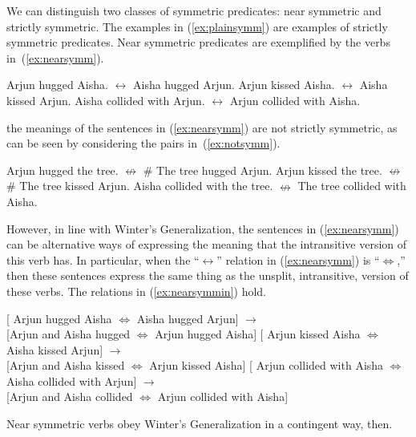\documentclass[twoside, 12pt]{article}
\begin{document}
We can distinguish two classes of symmetric predicates: near symmetric and strictly symmetric. The examples in (\ref{ex:plainsymm}) are examples of strictly symmetric predicates. Near symmetric predicates are exemplified by the verbs in~(\ref{ex:nearsymm}).
\begin{exe}
\raggedright
  \ex \label{ex:nearsymm}
  \begin{xlist}
    \ex Arjun hugged Aisha. $\leftrightarrow$ Aisha hugged Arjun.
    \ex Arjun kissed Aisha. $\leftrightarrow$ Aisha kissed Arjun.
    \ex Aisha collided with Arjun. $\leftrightarrow$ Arjun collided with Aisha.
  \end{xlist}
\end{exe}
the meanings of the sentences in (\ref{ex:nearsymm}) are not strictly symmetric, as can be seen by considering the pairs in~(\ref{ex:notsymm}).
\begin{exe}
\raggedright
  \ex \label{ex:notsymm}
  \begin{xlist}
    \ex Arjun hugged the tree. $\nleftrightarrow$ \# The tree hugged Arjun.
    \ex Arjun kissed the tree. $\nleftrightarrow$ \# The tree kissed Arjun.
    \ex Aisha collided with the tree. $\nleftrightarrow$ The tree collided with Aisha.
  \end{xlist}
\end{exe}
However, in line with Winter's Generalization, the sentences in (\ref{ex:nearsymm}) can be alternative ways of expressing the meaning that the intransitive version of this verb has. In particular, when the ``$\leftrightarrow$'' relation in (\ref{ex:nearsymm}) is ``$\Leftrightarrow$,'' then these sentences express the same thing as the unsplit, intransitive, version of these verbs. The relations in (\ref{ex:nearsymmin}) hold.
\begin{exe}
  \ex \label{ex:nearsymmin}
  \begin{xlist}
    \ex {} [ Arjun hugged Aisha $\Leftrightarrow$ Aisha hugged Arjun] $\rightarrow$\\ {} [Arjun and Aisha hugged $\Leftrightarrow$ Arjun hugged Aisha] 
    \ex {} [ Arjun kissed Aisha $\Leftrightarrow$ Aisha kissed Arjun] $\rightarrow$\\ {} [Arjun and Aisha kissed $\Leftrightarrow$ Arjun kissed Aisha] 
    \ex {} [ Arjun collided with Aisha $\Leftrightarrow$ Aisha collided with Arjun] $\rightarrow$\\ {} [Arjun and Aisha collided $\Leftrightarrow$ Arjun collided with Aisha] 
  \end{xlist}
\end{exe}
Near symmetric verbs obey Winter's Generalization in a contingent way, then. 
\end{document}
